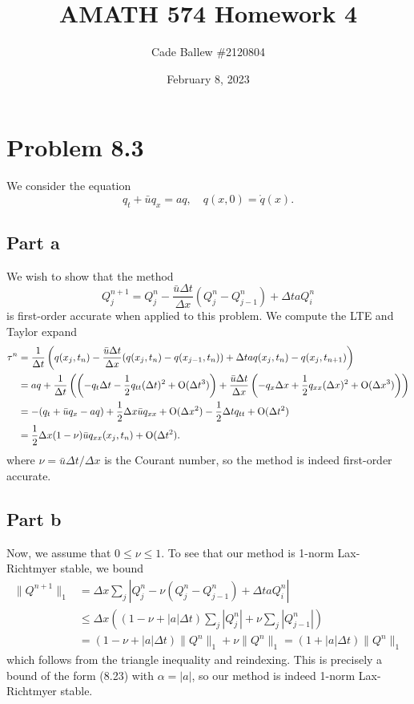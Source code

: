\documentclass{article}
\title{AMATH 574 Homework 4}
\author{Cade Ballew \#2120804}
\date{February 8, 2023}
\begin{document}
	
\maketitle
	
\section{Problem 8.3}
We consider the equation
\[
q_t+\bar uq_x=aq,\quad q(x,0)=\mathring{q}(x).
\]
\subsection{Part a}
We wish to show that the method 
\[
Q^{n+1}_j=Q^n_j-\frac{\bar u\Delta t}{\Delta x}(Q^n_j-Q^n_{j-1})+\Delta taQ^n_i
\]
is first-order accurate when applied to this problem. We compute the LTE and Taylor expand
\begin{align*}
\tau^n&=\frac{1}{\Delta t}\left(q(x_j,t_n)-\frac{\bar u\Delta t}{\Delta x}(q(x_j,t_n)-q(x_{j-1},t_n))+\Delta taq(x_j,t_n)-q(x_j,t_{n+1})\right)\\&=
aq+\frac{1}{\Delta t}\left(\left(-q_t\Delta t-\frac{1}{2}q_{tt}(\Delta t)^2+\operatorname{O}(\Delta t^3)\right)+\frac{\bar u\Delta t}{\Delta x}\left(-q_x\Delta x+\frac{1}{2}q_{xx}(\Delta x)^2+\operatorname{O}(\Delta x^3)\right)\right)\\&=
-(q_t+\bar uq_x-aq)+\frac{1}{2}\Delta x\bar u q_{xx}+\operatorname{O}(\Delta x^2)-\frac{1}{2}\Delta tq_{tt}+\operatorname{O}(\Delta t^2)\\&=
\frac{1}{2}\Delta x(1-\nu)\bar u q_{xx}(x_j,t_n)+\operatorname{O}(\Delta t^2).
\end{align*}
where $\nu=\bar{u}\Delta t/\Delta x$ is the Courant number, so the method is indeed first-order accurate.
\subsection{Part b}
Now, we assume that $0\leq\nu\leq1$. To see that our method is 1-norm Lax-Richtmyer stable, we bound
\begin{align*}
\|Q^{n+1}\|_1&=\Delta x\sum_j|Q_j^n-\nu(Q^n_j-Q^n_{j-1})+\Delta taQ^n_i|\\&\leq
\Delta x\left((1-\nu+|a|\Delta t)\sum_j|Q^n_j|+\nu\sum_j|Q^n_{j-1}|\right)\\&=
(1-\nu+|a|\Delta t)\|Q^n\|_1+\nu\|Q^n\|_1=(1+|a|\Delta t)\|Q^n\|_1
\end{align*}
which follows from the triangle inequality and reindexing. This is precisely a bound of the form (8.23) with $\alpha=|a|$, so our method is indeed 1-norm Lax-Richtmyer stable.
\end{document}

